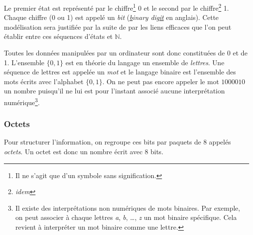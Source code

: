 \documentclass[../../main.tex]{subfiles}
\begin{document}
Le premier état est représenté par le chiffre\footnote{Il ne s'agit que d'un symbole sans signification.} 0 et le second par le chiffre\footnote{\textit{idem}} 1. Chaque chiffre (0 ou 1) est appelé un \textit{bit} (\textit{\underline{b}inary dig\underline{it}} en anglais). Cette modélisation sera justifiée par la suite de par les liens efficaces que l'on peut établir entre ces séquences d'états et $\mathbb{N}$.

Toutes les données manipulées par un ordinateur sont donc constituées de 0 et de 1. L'ensemble $\{0, 1\}$ est en théorie du langage un ensemble de \textit{lettres}. Une séquence de lettres est appelée un \textit{mot} et le langage binaire est l'ensemble des mots écrits avec l'alphabet $\{0, 1\}$. On ne peut pas encore appeler le mot $1000010$ un nombre puisqu'il ne lui est pour l'instant associé aucune interprétation numérique\footnote{Il existe des interprétations non numériques de mots binaires. Par exemple, on peut associer à chaque lettres \textit{a}, \textit{b}, \dots, \textit{z} un mot binaire spécifique. Cela revient à interpréter un mot binaire comme une lettre.}.
\subsubsection{Octets}
\label{ssub:octets}
Pour structurer l'information, on regroupe ces bits par paquets de 8 appelés \textit{octets}. Un octet est donc un nombre écrit avec 8 bits.
\end{document}
